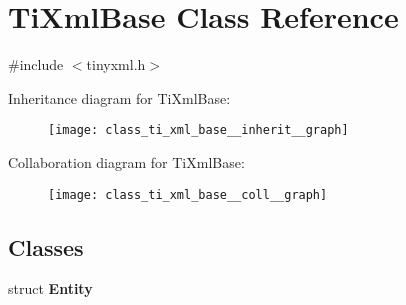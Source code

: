 \hypertarget{class_ti_xml_base}{\section{\-Ti\-Xml\-Base \-Class \-Reference}
\label{class_ti_xml_base}
}


{\ttfamily \#include $<$tinyxml.\-h$>$}



\-Inheritance diagram for \-Ti\-Xml\-Base\-:
\nopagebreak
\begin{figure}[H]
\begin{center}
\leavevmode
\texttt{[image: class\_ti\_xml\_base\_\_inherit\_\_graph]}
\end{center}
\end{figure}


\-Collaboration diagram for \-Ti\-Xml\-Base\-:
\nopagebreak
\begin{figure}[H]
\begin{center}
\leavevmode
\texttt{[image: class\_ti\_xml\_base\_\_coll\_\_graph]}
\end{center}
\end{figure}
\subsection*{\-Classes}
\begin{DoxyCompactItemize}
\item 
struct {\bfseries \-Entity}
\end{DoxyCompactItemize}
